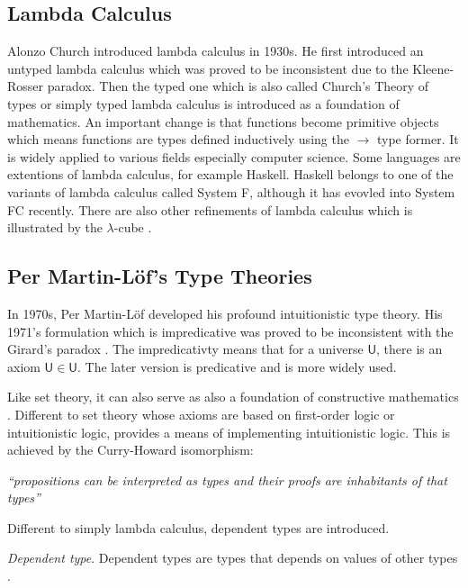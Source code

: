 \subsection{Lambda Calculus}

Alonzo Church introduced lambda calculus in 1930s. He first introduced
an untyped lambda calculus which was proved to be inconsistent due to
the Kleene-Rosser paradox. Then the typed one which is also called
Church's Theory of types or simply typed lambda calculus is
introduced as a foundation of mathematics. An important change is that functions become primitive objects which means functions are types defined inductively using the $\rightarrow$ type former. It is widely applied to
various fields especially computer science. Some languages are extentions of lambda calculus, for example Haskell. Haskell belongs to one of the variants of lambda calculus called System F, although it has evovled into System FC recently. There are also other refinements of lambda calculus which is illustrated by the $\lambda$-cube \cite{barendregt1991introduction}.


\subsection{Per Martin-L\"{o}f's Type Theories}

In 1970s, Per Martin-L\"{o}f \cite{per:71,per:82}  developed his profound intuitionistic type theory. His 1971's formulation which is impredicative was proved to be inconsistent with the Girard's paradox \cite{hurkens1995simplification}. The impredicativty means that for a universe $\mathsf{U}$, there is an axiom $\mathsf{U} \in \mathsf{U}$. The later version is predicative and is more widely used.

Like set theory, it can also serve as also a foundation of constructive mathematics \cite{martin1984intuitionistic}. Different to set theory whose axioms are based on first-order logic or intuitionistic logic, \mltt provides a means of implementing intuitionistic logic. This is achieved by the Curry-Howard
isomorphism:

\emph{``propositions can be interpreted as types and their
  proofs are inhabitants of that types''} 


Different to simply lambda calculus, dependent types are introduced.

\begin{definition}\label{dpty}
\textit{Dependent type}. Dependent types are types that depends on values of other types \cite{dtw}. 
\end{definition}

